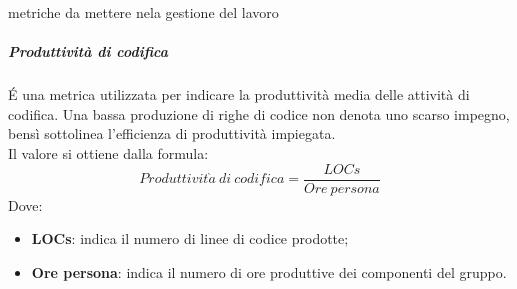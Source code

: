 \documentclass[../NormeDiProgetto.tex]{subfiles}
\begin{document}
metriche da mettere nela gestione del lavoro
			\subparagraph{Produttività di codifica}
				É una metrica utilizzata per indicare la produttività media delle attività di codifica. Una bassa produzione di righe di codice non denota uno scarso impegno, bensì sottolinea l'efficienza di produttività impiegata. \\Il valore si ottiene dalla formula:
				\begin{equation*}
					Produttivit\grave{a} \ di \ codifica = \frac{LOCs}{Ore \ persona}
				\end{equation*}
				Dove:
				\begin{itemize}
					\item \textbf{LOCs}: indica il numero di linee di codice prodotte;
					\item \textbf{Ore persona}: indica il numero di ore produttive dei componenti del gruppo.
				\end{itemize}
\end{document}
